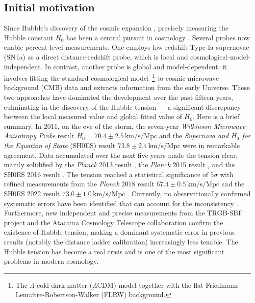 \documentclass[aps,prd,twocolumn]{revtex4-2}
\newcommand\HubbleUnit{{\mathrm{km}/\mathrm{s}/\mathrm{Mpc}}}
\begin{document}
\subsection{Initial motivation}\label{sec:I.A}
Since Hubble's discovery of the cosmic expansion \cite{Hubble1929.ProcNatlAcadSciUSA.15.168}, precisely measuring the Hubble constant $H_0$ has been a central pursuit in cosmology \cite{Sandage1958.ApJ.127.513,Tully1977.AaA.54.661,Freedman2001.ApJ.553.47}. Several probes now enable percent-level measurements. One employs low-redshift Type Ia supernovae (SN\,Ia) as a direct distance-redshift probe, which is local and cosmological-model-independent. In contrast, another probe is global and model-dependent: it involves fitting the standard cosmological model~\footnote{The $\Lambda$-cold-dark-matter ($\Lambda$CDM) model together with the flat Friedmann-Lema\^itre-Robertson-Walker (FLRW) background.} to cosmic microwave background (CMB) data and extracts information from the early Universe. These two approaches have dominated the development over the past fifteen years, culminating in the discovery of the Hubble tension --- a significant discrepancy between the local measured value and global fitted value of $H_0$. Here is a brief summary. In 2011, on the eve of the storm, the seven-year \textit{Wilkinson Microwave Anisotropy Probe} result $H_0=70.4\pm2.5\,\HubbleUnit$ \cite{Komatsu2011.ApJS.192.18} and the \textit{Supernova and $H_0$ for the Equation of State} (SH0ES) result $73.8\pm2.4\,\HubbleUnit$ \cite{Riess2011.ApJ.730.119} were in remarkable agreement. Data accumulated over the next five years made the tension clear, mainly solidified by the \textit{Planck} 2013 result \cite{Ade2014.AaA.571.A16}, the \textit{Planck} 2015 result \cite{Ade2016.AaA.594.A13}, and the SH0ES 2016 result \cite{Riess2016.ApJ.826.56}. The tension reached a statistical significance of $5\sigma$ with refined measurements from the \textit{Planck} 2018 result $67.4\pm0.5\,\HubbleUnit$ \cite{Aghanim2020.AaA.641.A6} and the SH0ES 2022 result $73.0\pm1.0\,\HubbleUnit$ \cite{Riess2022.ApJL.934.L7}. Currently, no observationally confirmed systematic errors have been identified that can account for the inconsistency \cite{Efstathiou2021.OpenJAstrophys.4.8,Brout2022.ApJ.938.110,Anderson2024,DiValentino2025.PhysDarkUniverse.49.101965}. Furthermore, new independent and precise measurements from the TRGB-SBF project \cite{Jensen2025.ApJ.987.87} and the Atacama Cosmology Telescope collaboration \cite{Louis2025.JCAP.11.062} confirm the existence of Hubble tension, making a dominant systematic error in previous results (notably the distance ladder calibration) increasingly less tenable. The Hubble tension has become a real crisis and is one of the most significant problems in modern cosmology.
\end{document}
